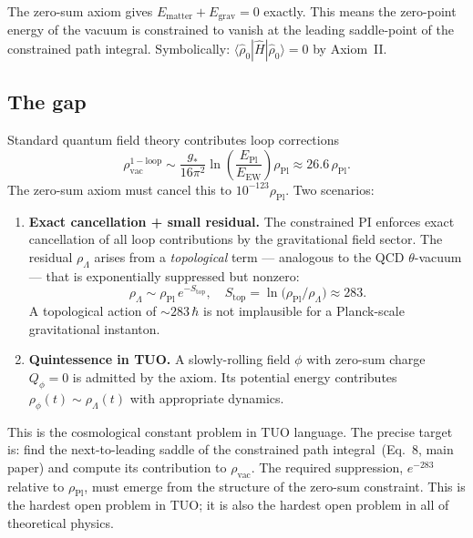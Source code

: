 \documentclass[12pt,a4paper]{article}
\theoremstyle{remark}
\newcommand{\gstar}{g_{*}}
\newcommand{\rhohat}{\hat{\rho}}
\newcommand{\Hhat}{\hat{H}}
\begin{document}
The zero-sum axiom gives $E_\mathrm{matter} + E_\mathrm{grav} = 0$ exactly.
This means the zero-point energy of the vacuum is constrained to vanish
at the leading saddle-point of the constrained path integral.
Symbolically: $\langle \rhohat_0 | \Hhat | \rhohat_0 \rangle = 0$
by Axiom~II.

\subsection{The gap}

Standard quantum field theory contributes loop corrections
\[
  \rho_\mathrm{vac}^\mathrm{1-loop}
  \sim \frac{\gstar}{16\pi^2}\ln\!\left(\frac{E_\mathrm{Pl}}{E_\mathrm{EW}}\right)\rho_\mathrm{Pl}
  \approx 26.6\,\rho_\mathrm{Pl}.
\]
The zero-sum axiom must cancel this to $10^{-123}\rho_\mathrm{Pl}$.
Two scenarios:

\begin{enumerate}
  \item \textbf{Exact cancellation + small residual.}
    The constrained PI enforces exact cancellation of all loop
    contributions by the gravitational field sector.
    The residual $\rho_\Lambda$ arises from a \emph{topological} term
    --- analogous to the QCD $\theta$-vacuum --- that is exponentially
    suppressed but nonzero:
    \[
      \rho_\Lambda \sim \rho_\mathrm{Pl}\,e^{-S_\mathrm{top}},\quad
      S_\mathrm{top} = \ln\!\bigl(\rho_\mathrm{Pl}/\rho_\Lambda\bigr)
      \approx 283.
    \]
    A topological action of $\sim 283\,\hbar$ is not implausible for
    a Planck-scale gravitational instanton.

  \item \textbf{Quintessence in TUO.}
    A slowly-rolling field $\phi$ with zero-sum charge $Q_\phi = 0$
    is admitted by the axiom.
    Its potential energy contributes $\rho_\phi(t) \sim \rho_\Lambda(t)$
    with appropriate dynamics.
\end{enumerate}

\begin{tcolorbox}[openbox,title={What closes OP3}]
This is the cosmological constant problem in TUO language.
The precise target is: find the next-to-leading saddle of the
constrained path integral~(Eq.~8, main paper) and compute its
contribution to $\rho_\mathrm{vac}$.
The required suppression, $e^{-283}$ relative to $\rho_\mathrm{Pl}$,
must emerge from the structure of the zero-sum constraint.
This is the hardest open problem in TUO; it is also the hardest open
problem in all of theoretical physics.
\end{tcolorbox}
\end{document}
